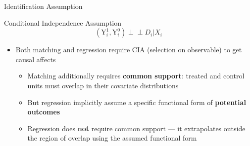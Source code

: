 \documentclass[dvipsnames,hyperref={pdfpagelabels=false}]{beamer}
\newcommand{\indep}{\perp\!\!\!\perp}
\begin{document}
\begin{frame}{Identification Assumption}
	
	\begin{block}{Conditional Independence Assumption}
		\begin{equation*}
		(\mathrm{Y}^{1}_{i},\mathrm{Y}^{0}_{i})\indep D_{i}|X_{i}
		\end{equation*}
	\end{block}
	\begin{itemize}
		
		\vspace{0.3cm}
		\item Both matching and regression require CIA (selection on observable) to get causal affects
		\vspace{0.3cm}
		\begin{itemize}
        \item Matching additionally requires \textbf{common support}: treated and control units must overlap in their covariate distributions
			\vspace{0.2cm}
			\item But regression implicitly assume a specific functional form of \textbf{potential outcomes}
			\vspace{0.2cm}

			\item Regression does \textbf{not} require common support --- it extrapolates outside the region of overlap using the assumed functional form
		\end{itemize}
	\end{itemize}
\end{frame}
\end{document}
